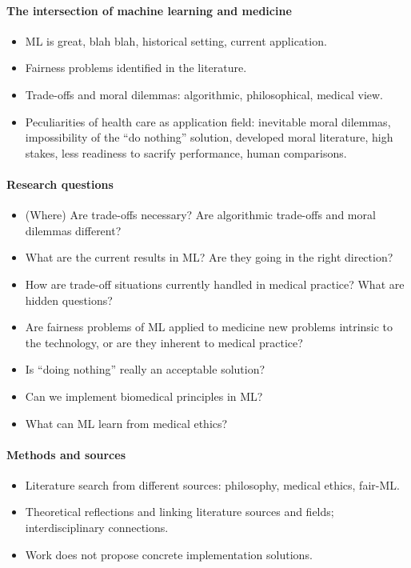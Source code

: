 \paragraph{The intersection of machine learning and medicine}
\begin{itemize}
    \item ML is great, blah blah, historical setting, current application.
    \item Fairness problems identified in the literature.
    \item Trade-offs and moral dilemmas: algorithmic, philosophical, medical view.
    \item Peculiarities of health care as application field:
        inevitable moral dilemmas, impossibility of the ``do nothing'' solution, developed moral literature, high stakes, less readiness to sacrify performance, human comparisons.
\end{itemize}

\paragraph{Research questions}
\begin{itemize}
    \item (Where) Are trade-offs necessary? Are algorithmic trade-offs and moral dilemmas different?
    \item What are the current results in ML? Are they going in the right direction?
    \item How are trade-off situations currently handled in medical practice? What are hidden questions?
    \item Are fairness problems of ML applied to medicine new problems intrinsic to the technology, or are they inherent to medical practice?
    \item Is ``doing nothing'' really an acceptable solution?
    \item Can we implement biomedical principles in ML?
    \item What can ML learn from medical ethics?
\end{itemize}

\paragraph{Methods and sources}
\begin{itemize}
    \item Literature search from different sources: philosophy, medical ethics, fair-ML.
    \item Theoretical reflections and linking literature sources and fields; interdisciplinary connections.
    \item Work does not propose concrete implementation solutions.
\end{itemize}

